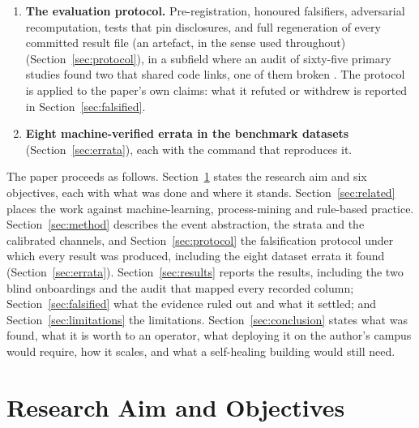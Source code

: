 \documentclass[11pt,letterpaper]{article}
\begin{document}
\begin{enumerate}
\item \textbf{The evaluation protocol.} Pre-registration, honoured falsifiers, adversarial recomputation, tests that pin disclosures, and full regeneration of every committed result file (an artefact, in the sense used throughout) (Section~\ref{sec:protocol}), in a subfield where an audit of sixty-five primary studies found two that shared code links, one of them broken \cite{mukhtar2025reproducibility}. The protocol is applied to the paper's own claims: what it refuted or withdrew is reported in Section~\ref{sec:falsified}.
\item \textbf{Eight machine-verified errata in the benchmark datasets} (Section~\ref{sec:errata}), each with the command that reproduces it.
\end{enumerate}

The paper proceeds as follows. Section~\ref{sec:aims} states the research aim and six objectives, each with what was done and where it stands. Section~\ref{sec:related} places the work against machine-learning, process-mining and rule-based practice. Section~\ref{sec:method} describes the event abstraction, the strata and the calibrated channels, and Section~\ref{sec:protocol} the falsification protocol under which every result was produced, including the eight dataset errata it found (Section~\ref{sec:errata}). Section~\ref{sec:results} reports the results, including the two blind onboardings and the audit that mapped every recorded column; Section~\ref{sec:falsified} what the evidence ruled out and what it settled; and Section~\ref{sec:limitations} the limitations. Section~\ref{sec:conclusion} states what was found, what it is worth to an operator, what deploying it on the author's campus would require, how it scales, and what a self-healing building would still need.

\section{Research Aim and Objectives}
\label{sec:aims}
\end{document}

